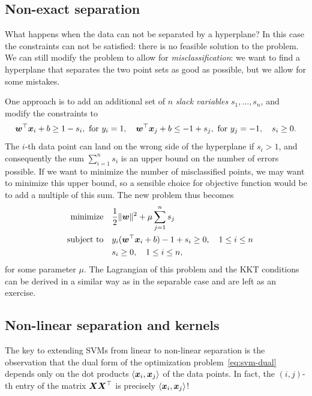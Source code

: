 \subsection{Non-exact separation}
What happens when the data can not be separated by a hyperplane? In this case the constraints can not be satisfied: there is no feasible solution to the problem. We can still modify the problem to allow for {\em misclassification}: we want to find a hyperplane that separates the two point sets as good as possible, but we allow for some mistakes.

One approach is to add an additional set of $n$ {\em slack variables} $s_1,\dots,s_n$, and modify the constraints to
\begin{equation*}
  \bm{w}^{\top}\bm{x}_i+b\geq 1-s_i, \text{ for } y_i=1, \quad \bm{w}^{\top}\bm{x}_j+b\leq -1+s_j, \text{ for } y_j=-1, \quad s_i\geq 0.
\end{equation*}
The $i$-th data point can land on the wrong side of the hyperplane if $s_i>1$, and consequently the sum $\sum_{i=1}^n s_i$ is an upper bound on the number of errors possible. If we want to minimize the number of misclassified points, we may want to minimize this upper bound, so a sensible choice for objective function would be to add a multiple of this sum. The new problem thus becomes
\begin{align*}
  \text{minimize}\quad &\frac{1}{2}\Vert {\bm{w}}\Vert^2+\mu\sum_{j=1}^n s_j\\
\quad\text{subject to}\quad & y_i(\bm{w}^{\top}\bm{x}_i+b)-1+s_i \geq 0, \quad 1\leq i\leq n\\
& s_i\geq 0, \quad 1\leq i\leq n,
\end{align*} 
for some parameter $\mu$. The Lagrangian of this problem and the KKT conditions can be derived in a similar way as in the separable case and are left as an exercise. 

\subsection{Non-linear separation and kernels}
The key to extending SVMs from linear to non-linear separation is the observation that the dual form of the optimization problem~\eqref{eq:svm-dual} depends only on the dot products $\langle {\bm{x}_i}, {\bm{x}_j} \rangle$ of the data points. In fact, the $(i,j)$-th entry of the matrix $\bm{X}\bm{X}^{\top}$ is precisely $\langle {\bm{x}_i}, {\bm{x}_j} \rangle$!

